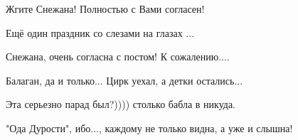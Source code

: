 \begin{itemize}
 
Жгите Снежана! Полностью с Вами согласен!

 
Ещё один праздник со слезами на глазах ...

 
Снежана, очень согласна с постом! К сожалению....

 
Балаган, да и только... Цирк уехал, а детки остались...

 
Эта серьезно парад был?)))) столько бабла в никуда.

 
"Ода Дурости", ибо..., каждому не только видна, а уже и слышна!

 

\end{itemize}
